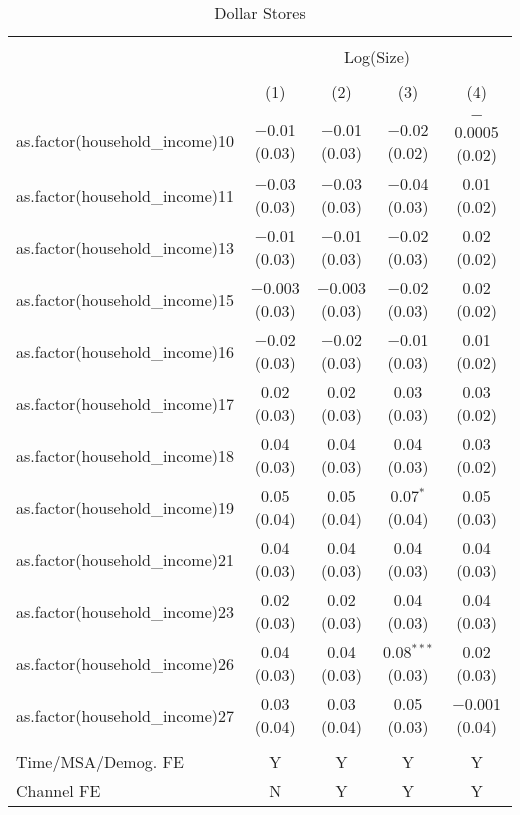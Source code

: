 
\begin{table}[!htbp] \centering 
  \caption{Dollar Stores} 
  \label{tab:packageSizeDollarappendix} 
\begin{tabular}{@{\extracolsep{5pt}}lcccc} 
\\[-1.8ex]\hline 
\hline \\[-1.8ex] 
 & \multicolumn{4}{c}{Log(Size)} \\ 
\\[-1.8ex] & (1) & (2) & (3) & (4)\\ 
\hline \\[-1.8ex] 
 as.factor(household\_income)10 & $-$0.01 (0.03) & $-$0.01 (0.03) & $-$0.02 (0.02) & $-$0.0005 (0.02) \\ 
  as.factor(household\_income)11 & $-$0.03 (0.03) & $-$0.03 (0.03) & $-$0.04 (0.03) & 0.01 (0.02) \\ 
  as.factor(household\_income)13 & $-$0.01 (0.03) & $-$0.01 (0.03) & $-$0.02 (0.03) & 0.02 (0.02) \\ 
  as.factor(household\_income)15 & $-$0.003 (0.03) & $-$0.003 (0.03) & $-$0.02 (0.03) & 0.02 (0.02) \\ 
  as.factor(household\_income)16 & $-$0.02 (0.03) & $-$0.02 (0.03) & $-$0.01 (0.03) & 0.01 (0.02) \\ 
  as.factor(household\_income)17 & 0.02 (0.03) & 0.02 (0.03) & 0.03 (0.03) & 0.03 (0.02) \\ 
  as.factor(household\_income)18 & 0.04 (0.03) & 0.04 (0.03) & 0.04 (0.03) & 0.03 (0.02) \\ 
  as.factor(household\_income)19 & 0.05 (0.04) & 0.05 (0.04) & 0.07$^{*}$ (0.04) & 0.05 (0.03) \\ 
  as.factor(household\_income)21 & 0.04 (0.03) & 0.04 (0.03) & 0.04 (0.03) & 0.04 (0.03) \\ 
  as.factor(household\_income)23 & 0.02 (0.03) & 0.02 (0.03) & 0.04 (0.03) & 0.04 (0.03) \\ 
  as.factor(household\_income)26 & 0.04 (0.03) & 0.04 (0.03) & 0.08$^{***}$ (0.03) & 0.02 (0.03) \\ 
  as.factor(household\_income)27 & 0.03 (0.04) & 0.03 (0.04) & 0.05 (0.03) & $-$0.001 (0.04) \\ 
 \hline \\[-1.8ex] 
Time/MSA/Demog. FE & Y & Y & Y & Y \\ 
Channel FE & N & Y & Y & Y \\ 

\end{tabular}
\end{table}
